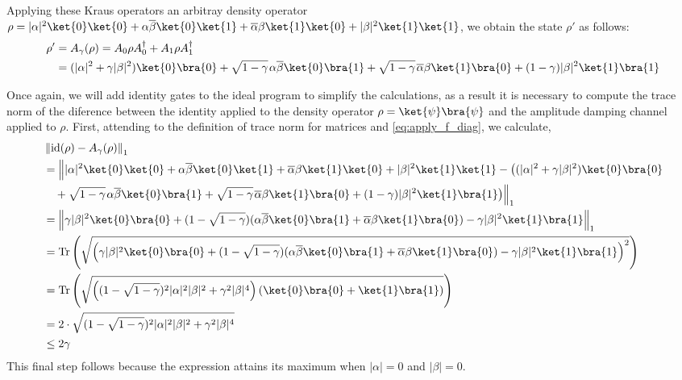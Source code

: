 \begin{example}
Applying these Kraus operators an arbitray density operator $\rho=|\alpha|^{2} \ket{0} \ket{0} + \alpha \overline{\beta} \ket{0} \ket{1} + \overline{\alpha} \beta \ket{1} \ket{0} + |\beta|^{2} \ket{1} \ket{1}$, we obtain the state $\rho'$ as follows:
\begin{align*}
     \rho' & = A_\gamma(\rho) =  A_{0} \rho A_{0}^{\dag} + A_{1} \rho A_{1}^{\dag} \\
     & = (|\alpha|^{2} + \gamma |\beta|^{2}) \ket{0}\bra{0} + \sqrt{1-\gamma} \hspace{1pt} \alpha \overline{\beta} \ket{0}\bra{1} + \sqrt{1-\gamma} \hspace{1pt} \overline{\alpha} \beta \ket{1}\bra{0} + (1-\gamma) |\beta|^{2} \ket{1}\bra{1}
\end{align*}

Once again, we will add identity gates to the ideal program to simplify the calculations, as a result it is necessary to compute the trace norm of the diference between the identity applied to the density operator $\rho = \ket{\psi} \bra{\psi}$ and the amplitude damping channel applied to $\rho$.
First, attending to the definition of trace norm for matrices and \autoref{eq:apply_f_diag}, we calculate, 
\begin{align*}
  & \tracenorm{ \id(\rho) - A_{\gamma}(\rho)} \\
  & =    \Big\lVert  |\alpha|^{2} \ket{0} \ket{0} + \alpha \overline{\beta} \ket{0} \ket{1} + \overline{\alpha} \beta \ket{1} \ket{0} + |\beta|^{2} \ket{1} \ket{1}  - \big((|\alpha|^{2} + \gamma |\beta|^{2}) \ket{0}\bra{0} \\ 
  & \hspace{10pt}  +  \sqrt{1-\gamma} \hspace{1pt} \alpha \overline{\beta} \ket{0}\bra{1} + \sqrt{1-\gamma} \hspace{1pt} \overline{\alpha} \beta \ket{1}\bra{0} + (1-\gamma) |\beta|^{2} \ket{1}\bra{1}\big) \Big\rVert_1 \\
   & = \tracenorm{\gamma |\beta|^{2} \ket{0} \bra{0} + (1-\sqrt{1-\gamma}) (\alpha \overline{\beta} \ket{0} \bra{1} + \overline{\alpha} \beta \ket{1} \bra{0}) - \gamma |\beta|^{2} \ket{1} \bra{1}} \\
   & = \tr \left( \sqrt{\left( \gamma |\beta|^{2} \ket{0} \bra{0} + (1-\sqrt{1-\gamma}) (\alpha \overline{\beta} \ket{0} \bra{1} + \overline{\alpha} \beta \ket{1} \bra{0}) - \gamma |\beta|^{2} \ket{1} \bra{1}  \right)^2}\right) \\
   & = \tr \left( \sqrt{\left( (1-\sqrt{1-\gamma})^{2} |\alpha|^{2}|\beta|^{2} + \gamma^{2} |\beta|^{4} \right) (\ket{0} \bra{0} + \ket{1} \bra{1} ) } \right) \\
   & = 2 \cdot \sqrt{  (1-\sqrt{1-\gamma})^{2} |\alpha|^{2}|\beta|^{2} + \gamma^{2} |\beta|^{4}} \\
   & \leq 2 \gamma
\end{align*}
This final step follows because the expression attains its maximum when 
$|\alpha|=0 $ and $|\beta|=0.$


\end{example}
